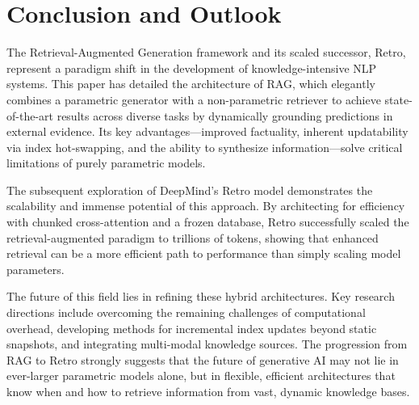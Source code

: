 \documentclass[a4paper,12pt]{article}
\begin{document}
\section{Conclusion and Outlook}
The Retrieval-Augmented Generation framework and its scaled successor, Retro, represent a paradigm shift in the development of knowledge-intensive NLP systems. This paper has detailed the architecture of RAG, which elegantly combines a parametric generator with a non-parametric retriever to achieve state-of-the-art results across diverse tasks by dynamically grounding predictions in external evidence. Its key advantages—improved factuality, inherent updatability via index hot-swapping, and the ability to synthesize information—solve critical limitations of purely parametric models.

The subsequent exploration of DeepMind's Retro model demonstrates the scalability and immense potential of this approach. By architecting for efficiency with chunked cross-attention and a frozen database, Retro successfully scaled the retrieval-augmented paradigm to trillions of tokens, showing that enhanced retrieval can be a more efficient path to performance than simply scaling model parameters.

The future of this field lies in refining these hybrid architectures. Key research directions include overcoming the remaining challenges of computational overhead, developing methods for incremental index updates beyond static snapshots, and integrating multi-modal knowledge sources. The progression from RAG to Retro strongly suggests that the future of generative AI may not lie in ever-larger parametric models alone, but in flexible, efficient architectures that know when and how to retrieve information from vast, dynamic knowledge bases.


\end{document}
